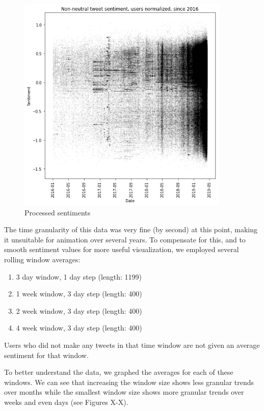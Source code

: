 \documentclass[12pt]{article}
\begin{document}
\begin{figure}[h!]
\begin{minipage}{0.45\textwidth}
        \includegraphics[width=0.9\textwidth]{nnz_since_2016} %
        \caption{Processed sentiments}
    \end{minipage}
\end{figure}

The time granularity of this data was very fine (by second) at this point, making it unsuitable for animation over several years. To compensate for this, and to smooth sentiment values for more useful visualization, we employed several rolling window averages:\newline
\begin{enumerate}
    \item 3 day window, 1 day step (length: 1199)
    \item 1 week window, 3 day step (length: 400)
    \item 2 week window, 3 day step (length: 400)
    \item 4 week window, 3 day step (length: 400)
\end{enumerate}

Users who did not make any tweets in that time window are not given an average sentiment for that window.\newline

To better understand the data, we graphed the averages for each of these windows. We can see that increasing the window size shows less granular trends over months while the smallest window size shows more granular trends over weeks and even days (see Figures X-X).
\end{document}
